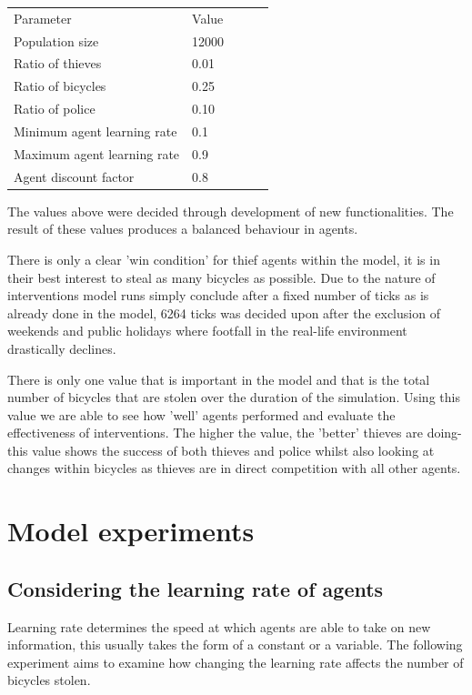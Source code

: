 \documentclass[11pt]{informatics-report}
\begin{document}
\begin{table}[]
\begin{tabular}{|l|l|lll}
\cline{1-2}
Parameter & Value \\ \cline{1-2}
Population size & 12000  \\ \cline{1-2}
Ratio of thieves & 0.01 \\ \cline{1-2}
Ratio of bicycles & 0.25  \\ \cline{1-2}
Ratio of police & 0.10 \\ \cline{1-2}
Minimum agent learning rate & 0.1 \\ \cline{1-2}
Maximum agent learning rate & 0.9 \\ \cline{1-2}
Agent discount factor & 0.8 \\ \cline{1-2}
\end{tabular}
\end{table}

The values above were decided through development of new functionalities. The result of these values produces a balanced behaviour in agents. \par

There is only a clear 'win condition' for thief agents within the model, it is in their best interest to steal as many bicycles as possible. Due to the nature of interventions model runs simply conclude after a fixed number of ticks as is already done in the model, 6264 ticks was decided upon after the exclusion of weekends and public holidays where footfall in the real-life environment drastically declines. \par

There is only one value that is important in the model and that is the total number of bicycles that are stolen over the duration of the simulation. Using this value we are able to see how 'well' agents performed and evaluate the effectiveness of interventions. The higher the value, the 'better' thieves are doing- this value shows the success of both thieves and police whilst also looking at changes within bicycles as thieves are in direct competition with all other agents.  

\section{Model experiments}
\subsection{Considering the learning rate of agents}
Learning rate determines the speed at which agents are able to take on new information, this usually takes the form of a constant or a variable. The following experiment aims to examine how changing the learning rate affects the number of bicycles stolen. 
\end{document}
